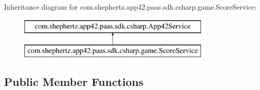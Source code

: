 Inheritance diagram for com.\+shephertz.\+app42.\+paas.\+sdk.\+csharp.\+game.\+Score\+Service\+:\begin{figure}[H]
\begin{center}
\leavevmode
\includegraphics[height=2.000000cm]{classcom_1_1shephertz_1_1app42_1_1paas_1_1sdk_1_1csharp_1_1game_1_1_score_service}
\end{center}
\end{figure}
\subsection*{Public Member Functions}
